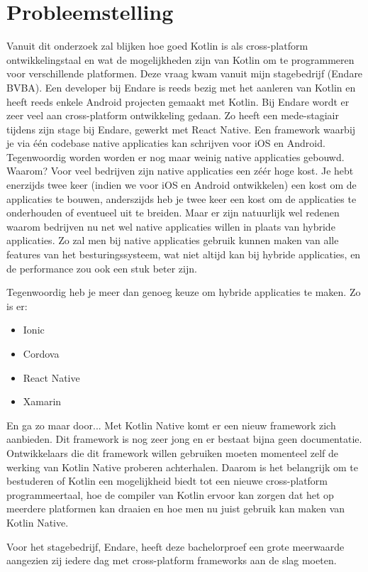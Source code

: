 \section{Probleemstelling}
\label{sec:probleemstelling}
Vanuit dit onderzoek zal blijken hoe goed Kotlin is als cross-platform ontwikkelingstaal en wat de mogelijkheden zijn van Kotlin om te programmeren voor verschillende platformen. Deze vraag kwam vanuit mijn stagebedrijf (Endare BVBA). Een developer bij Endare is reeds bezig met het aanleren van Kotlin en heeft reeds enkele Android projecten gemaakt met Kotlin. Bij Endare wordt er zeer veel aan cross-platform ontwikkeling gedaan. Zo heeft een mede-stagiair tijdens zijn stage bij Endare, gewerkt met React Native. Een framework waarbij je via één codebase native applicaties kan schrijven voor iOS en Android. Tegenwoordig worden worden er nog maar weinig native applicaties gebouwd. Waarom? Voor veel bedrijven zijn native applicaties een zéér hoge kost. Je hebt enerzijds twee keer (indien we voor iOS en Android ontwikkelen) een kost om de applicaties te bouwen, anderszijds heb je twee keer een kost om de applicaties te onderhouden of eventueel uit te breiden. Maar er zijn natuurlijk wel redenen waarom bedrijven nu net wel native applicaties willen in plaats van hybride applicaties. Zo zal men bij native applicaties gebruik kunnen maken van alle features van het besturingssysteem, wat niet altijd kan bij hybride applicaties, en de performance zou ook een stuk beter zijn. 

Tegenwoordig heb je meer dan genoeg keuze om hybride applicaties te maken. Zo is er:
\begin{itemize}
	\item Ionic
	\item Cordova
	\item React Native
	\item Xamarin
\end{itemize}
En ga zo maar door... Met Kotlin Native komt er een nieuw framework zich aanbieden. Dit framework is nog zeer jong en er bestaat bijna geen documentatie. Ontwikkelaars die dit framework willen gebruiken moeten momenteel zelf de werking van Kotlin Native proberen achterhalen. Daarom is het belangrijk om te bestuderen of Kotlin een mogelijkheid biedt tot een nieuwe cross-platform programmeertaal, hoe de compiler van Kotlin ervoor kan zorgen dat het op meerdere platformen kan draaien en hoe men nu juist gebruik kan maken van Kotlin Native. 

Voor het stagebedrijf, Endare, heeft deze bachelorproef een grote meerwaarde aangezien zij iedere dag met cross-platform frameworks aan de slag moeten.


